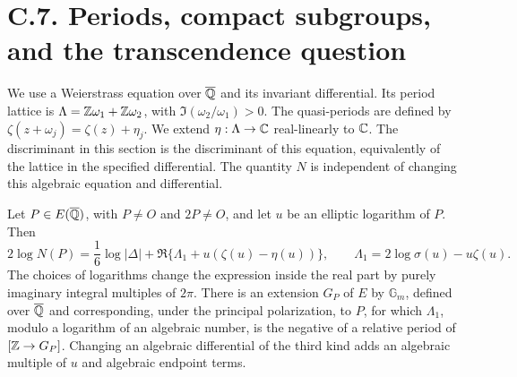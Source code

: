 \section{C.7. Periods, compact subgroups, and the transcendence question}

We use a Weierstrass equation over $\overline{\mathbb Q}$ and its invariant
differential. Its period lattice is $\Lambda=\mathbb Z\omega_1+\mathbb Z\omega_2$,
with $\Im(\omega_2/\omega_1)>0$. The quasi-periods are defined by
$\zeta(z+\omega_j)=\zeta(z)+\eta_j$. We extend
$\eta:\Lambda\to\mathbb C$ real-linearly to $\mathbb C$. The discriminant in
this section is the discriminant of this equation, equivalently of
the lattice in the specified differential. The quantity $N$ is
independent of changing this algebraic equation and differential.

\begin{statement}
Let $P\in E(\overline{\mathbb Q})$, with $P\ne O$ and $2P\ne O$, and
let $u$ be an elliptic logarithm of $P$. Then
\begin{equation}\label{eq:cp-sigma}
 2\log N(P)=\frac16\log|\Delta|
       +\Re\{\Lambda_1+u(\zeta(u)-\eta(u))\},
 \qquad \Lambda_1=2\log\sigma(u)-u\zeta(u).
\end{equation}
The choices of logarithms change the expression inside the real
part by purely imaginary integral multiples of $2\pi$.
There is an extension $G_P$ of $E$ by $\mathbb G_m$, defined
over $\overline{\mathbb Q}$ and corresponding, under the principal
polarization, to $P$, for which $\Lambda_1$, modulo a logarithm
of an algebraic number, is the negative of a relative period
of $[\mathbb Z\to G_P]$. Changing an algebraic differential of the
third kind adds an algebraic multiple of $u$ and algebraic
endpoint terms.
\end{statement}
